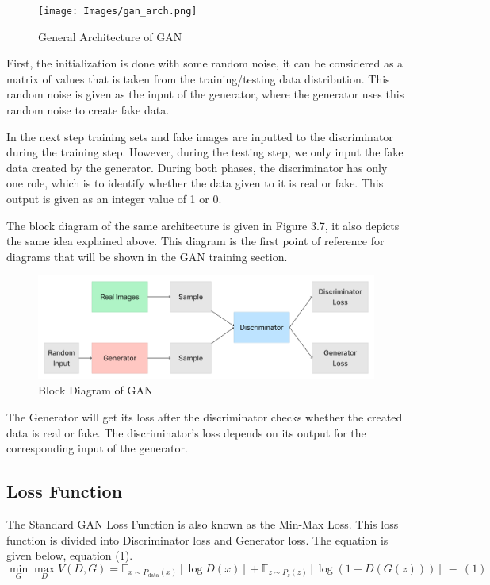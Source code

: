 \begin{figure}[h!]
    \centering
    \texttt{[image: Images/gan\_arch.png]}
    \caption{General Architecture of GAN}
\end{figure}

\noindent
First, the initialization is done with some random noise, it can be considered as a matrix of values that is taken from the training/testing data distribution. This random noise is given as the input of the generator, where the generator uses this random noise to create fake data.

\noindent
In the next step training sets and fake images are inputted to the discriminator during the training step. However, during the testing step, we only input the fake data created by the generator. During both phases, the discriminator has only one role, which is to identify whether the data given to it is real or fake. This output is given as an integer value of 1 or 0.

\noindent
The block diagram of the same architecture is given in Figure 3.7, it also depicts the same idea explained above. This diagram is the first point of reference for diagrams that will be shown in the GAN training section.

\clearpage

\begin{figure}[h!]
    \centering
    \includegraphics[width=\textwidth]{Images/gan_block_diag.png}
    \caption{Block Diagram of GAN}
\end{figure}

\noindent
The Generator will get its loss after the discriminator checks whether the created data is real or fake. The discriminator's loss depends on its output for the corresponding input of the generator. 

\subsection{Loss Function}

\noindent
The Standard GAN Loss Function is also known as the Min-Max Loss\cite{Nips_GAN}. This loss function is divided into Discriminator loss and Generator loss. The equation is given below, equation (1).
\[
\min_G \max_D V(D,G) = \mathbb{E}_{x \sim P_{\text{data}}(x)}[\log D(x)] + \mathbb{E}_{z \sim P_z(z)}[\log (1 - D(G(z)))]~-~(1)
\]

